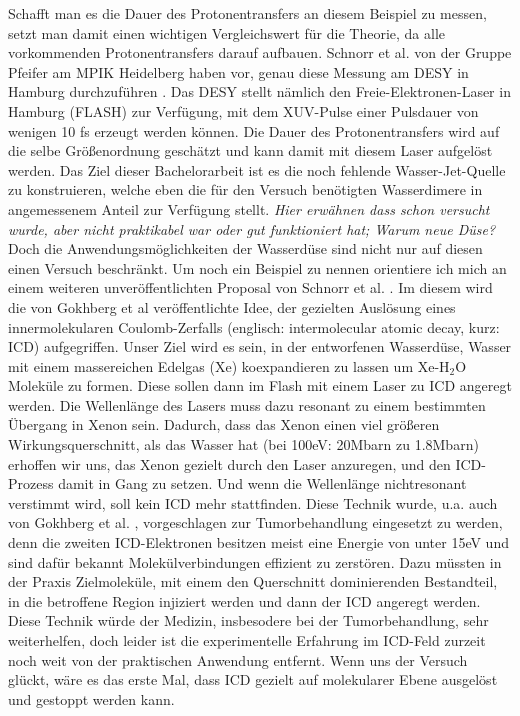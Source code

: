   Schafft man es die Dauer des Protonentransfers an diesem Beispiel zu messen, setzt man damit einen wichtigen Vergleichswert für die Theorie, da alle vorkommenden Protonentransfers darauf aufbauen. Schnorr et al. von der Gruppe Pfeifer am MPIK Heidelberg haben vor, genau diese Messung am DESY in Hamburg durchzuführen \cite{SchPTD15}. Das DESY stellt nämlich den Freie-Elektronen-Laser in Hamburg (FLASH) zur Verfügung, mit dem XUV-Pulse einer Pulsdauer von wenigen 10 fs erzeugt werden können. Die Dauer des Protonentransfers wird auf die selbe Größenordnung geschätzt und kann damit mit diesem Laser aufgelöst werden.
  Das Ziel dieser Bachelorarbeit ist es die noch fehlende Wasser-Jet-Quelle zu konstruieren, welche eben die für den Versuch benötigten Wasserdimere in angemessenem Anteil zur Verfügung stellt. 
  \textit{Hier erwähnen dass schon versucht wurde, aber nicht praktikabel war oder gut funktioniert hat; Warum neue Düse?}
  Doch die Anwendungsmöglichkeiten der Wasserdüse sind nicht nur auf diesen einen Versuch beschränkt. Um noch ein Beispiel zu nennen orientiere ich mich an einem weiteren unveröffentlichten Proposal von Schnorr et al. \cite{SchICD15}. Im diesem wird die von Gokhberg et al \cite{gokhberg2014} veröffentlichte Idee, der gezielten Auslösung eines innermolekularen Coulomb-Zerfalls (englisch: intermolecular atomic decay, kurz: ICD) aufgegriffen. Unser Ziel wird es sein, in der entworfenen Wasserdüse, Wasser mit einem massereichen Edelgas (Xe) koexpandieren zu lassen um Xe-H$_2$O Moleküle zu formen. Diese sollen dann im Flash mit einem Laser zu ICD angeregt werden. Die Wellenlänge des Lasers muss dazu resonant zu einem bestimmten Übergang in Xenon sein. Dadurch, dass das Xenon einen viel größeren Wirkungsquerschnitt, als das Wasser hat (bei 100eV: 20Mbarn zu 1.8Mbarn) erhoffen wir uns, das Xenon gezielt durch den Laser anzuregen, und den ICD-Prozess damit in Gang zu setzen. Und wenn die Wellenlänge nichtresonant verstimmt wird, soll kein ICD mehr stattfinden. Diese Technik wurde, u.a. auch von Gokhberg et al. \cite{gokhberg2014}, vorgeschlagen zur Tumorbehandlung eingesetzt zu werden, denn die zweiten ICD-Elektronen besitzen meist eine Energie von unter 15eV und sind dafür bekannt Molekülverbindungen effizient zu zerstören.  Dazu müssten in der Praxis Zielmoleküle, mit einem den Querschnitt dominierenden Bestandteil, in die betroffene Region injiziert werden und dann der ICD angeregt werden. 
  Diese Technik würde der Medizin, insbesodere bei der Tumorbehandlung, sehr weiterhelfen, doch leider ist die experimentelle Erfahrung im ICD-Feld zurzeit noch weit von der praktischen Anwendung entfernt. Wenn uns der Versuch glückt, wäre es das erste Mal, dass ICD gezielt auf molekularer Ebene ausgelöst und gestoppt werden kann.
  

